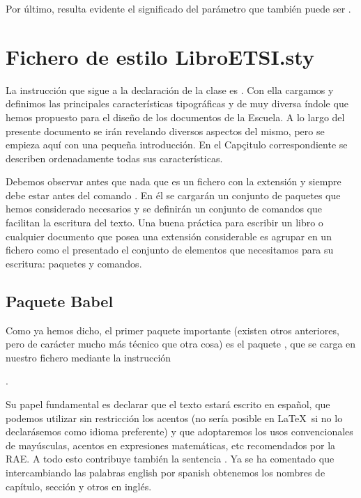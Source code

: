 Por último, resulta evidente el significado  del parámetro  que también puede ser .

\section{Fichero de estilo LibroETSI.sty}
La instrucción que sigue a la declaración de la clase es  . Con ella  cargamos y definimos  las principales características tipográficas y de muy diversa índole que hemos propuesto para el diseño de los documentos de la Escuela. A lo largo del presente documento se irán revelando diversos aspectos del mismo, pero se empieza aquí con una pequeña introducción. En el Capçitulo correspondiente se describen ordenadamente todas sus características. 

Debemos observar antes que nada que es un fichero con la extensión  y siempre debe estar antes del comando . En él se cargarán un conjunto de paquetes que hemos considerado necesarios y se definirán un conjunto de comandos que facilitan la escritura del texto. Una buena práctica para escribir un libro o cualquier documento que posea una extensión considerable es agrupar en un fichero como el presentado el conjunto de elementos que necesitamos para su escritura: paquetes y comandos.

\subsection{Paquete Babel}
Como ya hemos dicho, el primer paquete importante (existen otros anteriores, pero de carácter mucho más técnico que otra cosa) es el paquete , que se carga en nuestro fichero mediante la instrucción 

. 

Su papel fundamental es declarar que el texto estará escrito en español, que podemos utilizar sin restricción los acentos (no sería posible en \LaTeX\ si no lo declarásemos como idioma preferente) y que adoptaremos los usos convencionales de mayúsculas, acentos en expresiones matemáticas, etc recomendados por la RAE. A todo esto contribuye también la sentencia . Ya se ha comentado que intercambiando las palabras english por spanish obtenemos los nombres de capítulo, sección y otros en inglés.

